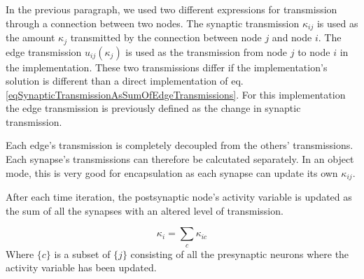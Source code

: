 			In the previous paragraph, we used two 		 different expressions for transmission through a connection between two nodes. 
			The synaptic transmission $\kappa_{ij}$ is used as the amount $\kappa_j$ transmitted by the connection between node $j$ and node $i$. 
			The edge transmission $u_{ij}(\kappa_j)$ is used as the transmission from node $j$ to node $i$ in the implementation. 
			These two transmissions differ if the implementation's solution is different than a direct implementation of eq. \eqref{eqSynapticTransmissionAsSumOfEdgeTransmissions}.
			For this implementation the edge transmission is previously defined as the change in synaptic transmission. 


			Each edge's transmission is completely decoupled from the others' transmissions.
			Each synapse's transmissions can therefore be calcutated separately.
			In an object mode, this is very good for encapsulation as each synapse can update its own $\kappa_{ij}$.

			After each time iteration, the postsynaptic node's activity variable is updated as the sum of all the synapses with an altered level of transmission.

			\begin{equation}
				\kappa_i = \sum_c{\kappa_{ic}}
				\label{eqSynapticTransmissionForKANNimplementation}
			\end{equation}
			Where $\{c\}$ is a subset of $\{j\}$ consisting of all the presynaptic neurons where the activity variable has been updated.


